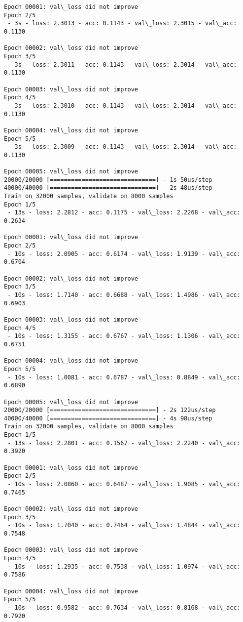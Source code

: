 \documentclass[11pt]{article}
\begin{document}
\begin{Verbatim}[commandchars=\\\{\}]
Epoch 00001: val\_loss did not improve
Epoch 2/5
 - 3s - loss: 2.3013 - acc: 0.1143 - val\_loss: 2.3015 - val\_acc: 0.1130

Epoch 00002: val\_loss did not improve
Epoch 3/5
 - 3s - loss: 2.3011 - acc: 0.1143 - val\_loss: 2.3014 - val\_acc: 0.1130

Epoch 00003: val\_loss did not improve
Epoch 4/5
 - 3s - loss: 2.3010 - acc: 0.1143 - val\_loss: 2.3014 - val\_acc: 0.1130

Epoch 00004: val\_loss did not improve
Epoch 5/5
 - 3s - loss: 2.3009 - acc: 0.1143 - val\_loss: 2.3014 - val\_acc: 0.1130

Epoch 00005: val\_loss did not improve
20000/20000 [==============================] - 1s 50us/step
40000/40000 [==============================] - 2s 48us/step
Train on 32000 samples, validate on 8000 samples
Epoch 1/5
 - 13s - loss: 2.2812 - acc: 0.1175 - val\_loss: 2.2268 - val\_acc: 0.2634

Epoch 00001: val\_loss did not improve
Epoch 2/5
 - 10s - loss: 2.0905 - acc: 0.6174 - val\_loss: 1.9139 - val\_acc: 0.6704

Epoch 00002: val\_loss did not improve
Epoch 3/5
 - 10s - loss: 1.7140 - acc: 0.6688 - val\_loss: 1.4986 - val\_acc: 0.6903

Epoch 00003: val\_loss did not improve
Epoch 4/5
 - 10s - loss: 1.3155 - acc: 0.6767 - val\_loss: 1.1306 - val\_acc: 0.6751

Epoch 00004: val\_loss did not improve
Epoch 5/5
 - 10s - loss: 1.0081 - acc: 0.6787 - val\_loss: 0.8849 - val\_acc: 0.6890

Epoch 00005: val\_loss did not improve
20000/20000 [==============================] - 2s 122us/step
40000/40000 [==============================] - 4s 98us/step
Train on 32000 samples, validate on 8000 samples
Epoch 1/5
 - 13s - loss: 2.2801 - acc: 0.1567 - val\_loss: 2.2240 - val\_acc: 0.3920

Epoch 00001: val\_loss did not improve
Epoch 2/5
 - 10s - loss: 2.0860 - acc: 0.6487 - val\_loss: 1.9085 - val\_acc: 0.7465

Epoch 00002: val\_loss did not improve
Epoch 3/5
 - 10s - loss: 1.7040 - acc: 0.7464 - val\_loss: 1.4844 - val\_acc: 0.7548

Epoch 00003: val\_loss did not improve
Epoch 4/5
 - 10s - loss: 1.2935 - acc: 0.7538 - val\_loss: 1.0974 - val\_acc: 0.7586

Epoch 00004: val\_loss did not improve
Epoch 5/5
 - 10s - loss: 0.9582 - acc: 0.7634 - val\_loss: 0.8168 - val\_acc: 0.7920


\end{Verbatim}
\end{document}
